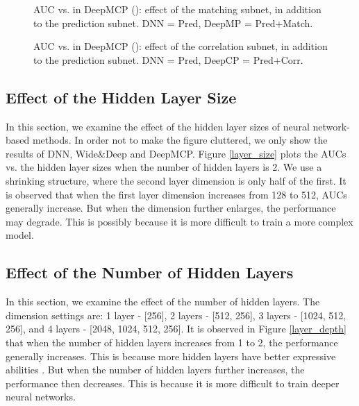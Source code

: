 \documentclass{article}
\begin{document}
\begin{figure}[!t]
\centering
{}
\vskip -8pt
\caption{AUC vs.  in DeepMCP (): effect of the matching subnet, in addition to the prediction subnet. DNN = Pred, DeepMP = Pred+Match.}
\vskip -10pt
\label{tune_m}
\end{figure}

\begin{figure}[!t]
\centering
{}
\vskip -8pt
\caption{AUC vs.  in DeepMCP (): effect of the correlation subnet, in addition to the prediction subnet. DNN = Pred, DeepCP = Pred+Corr.}
\vskip -10pt
\label{tune_c}
\end{figure}

\subsection{Effect of the Hidden Layer Size}
In this section, we examine the effect of the hidden layer sizes of neural network-based methods.
In order not to make the figure cluttered, we only show the results of DNN, Wide\&Deep and DeepMCP. Figure \ref{layer_size} plots the AUCs vs. the hidden layer sizes when the number of hidden layers is 2. We use a shrinking structure, where the second layer dimension is only half of the first. It is observed that when the first layer dimension increases from 128 to 512, AUCs generally increase. But when the dimension further enlarges, the performance may degrade. This is possibly because it is more difficult to train a more complex
model.

\subsection{Effect of the Number of Hidden Layers}
In this section, we examine the effect of the number of hidden layers.
The dimension settings are: 1 layer - [256], 2 layers - [512, 256], 3 layers - [1024, 512, 256], and 4 layers - [2048, 1024, 512, 256]. It is observed in Figure \ref{layer_depth} that when the number of hidden layers increases from 1 to 2, the performance generally increases. This is because more hidden layers have better expressive abilities \cite{he2017neural}. But when the number of hidden layers further increases, the performance then decreases. This is because it is more difficult to train deeper neural networks.
\end{document}
